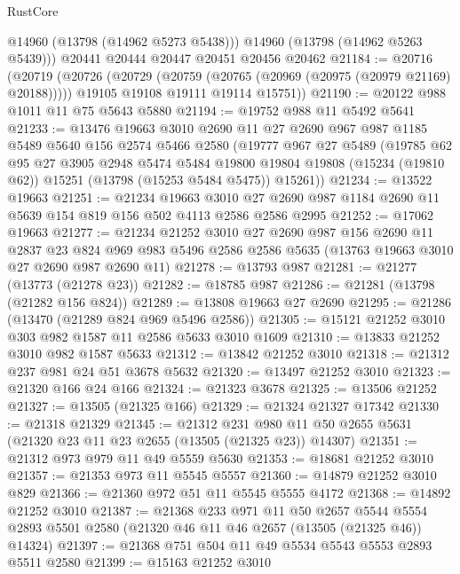 \begin{lexlean}{RustCore}
\begin{coremodule}
        @14960
        (@13798 (@14962 @5273 @5438)))
      @14960
      (@13798 (@14962 @5263 @5439)))
    @20441
    @20444
    @20447
    @20451
    @20456
    @20462
@21184 := @20716
    (@20719
      (@20726
        (@20729 (@20759 (@20765 (@20969 (@20975 (@20979 @21169) @20188)))))
        @19105
        @19108
        @19111
        @19114
        @15751))
@21190 := @20122 @988 @1011 @11 @75 @5643 @5880
@21194 := @19752 @988 @11 @5492 @5641
@21233 := @13476
    @19663
    @3010
    @2690
    @11
    @27
    @2690
    @967
    @987
    @1185
    @5489
    @5640
    @156
    @2574
    @5466
    @2580
    (@19777
      @967
      @27
      @5489
      (@19785
        @62
        @95
        @27
        @3905
        @2948
        @5474
        @5484
        @19800
        @19804
        @19808
        (@15234 (@19810 @62))
        @15251
        (@13798 (@15253 @5484 @5475))
        @15261))
@21234 := @13522 @19663
@21251 := @21234
    @19663
    @3010
    @27
    @2690
    @987
    @1184
    @2690
    @11
    @5639
    @154
    @819
    @156
    @502
    @4113
    @2586
    @2586
    @2995
@21252 := @17062 @19663
@21277 := @21234
    @21252
    @3010
    @27
    @2690
    @987
    @156
    @2690
    @11
    @2837
    @23
    @824
    @969
    @983
    @5496
    @2586
    @2586
    @5635
    (@13763 @19663 @3010 @27 @2690 @987 @2690 @11)
@21278 := @13793 @987
@21281 := @21277 (@13773 (@21278 @23))
@21282 := @18785 @987
@21286 := @21281 (@13798 (@21282 @156 @824))
@21289 := @13808 @19663 @27 @2690
@21295 := @21286 (@13470 (@21289 @824 @969 @5496 @2586))
@21305 := @15121 @21252 @3010 @303 @982 @1587 @11 @2586 @5633 @3010 @1609
@21310 := @13833 @21252 @3010 @982 @1587 @5633
@21312 := @13842 @21252 @3010
@21318 := @21312 @237 @981 @24 @51 @3678 @5632
@21320 := @13497 @21252 @3010
@21323 := @21320 @166 @24 @166
@21324 := @21323 @3678
@21325 := @13506 @21252
@21327 := @13505 (@21325 @166)
@21329 := @21324 @21327 @17342
@21330 := @21318 @21329
@21345 := @21312
    @231
    @980
    @11
    @50
    @2655
    @5631
    (@21320 @23 @11 @23 @2655 (@13505 (@21325 @23)) @14307)
@21351 := @21312 @973 @979 @11 @49 @5559 @5630
@21353 := @18681 @21252 @3010
@21357 := @21353 @973 @11 @5545 @5557
@21360 := @14879 @21252 @3010 @829
@21366 := @21360 @972 @51 @11 @5545 @5555 @4172
@21368 := @14892 @21252 @3010
@21387 := @21368
    @233
    @971
    @11
    @50
    @2657
    @5544
    @5554
    @2893
    @5501
    @2580
    (@21320 @46 @11 @46 @2657 (@13505 (@21325 @46)) @14324)
@21397 := @21368 @751 @504 @11 @49 @5534 @5543 @5553 @2893 @5511 @2580
@21399 := @15163 @21252 @3010

\end{coremodule}
\end{lexlean}
